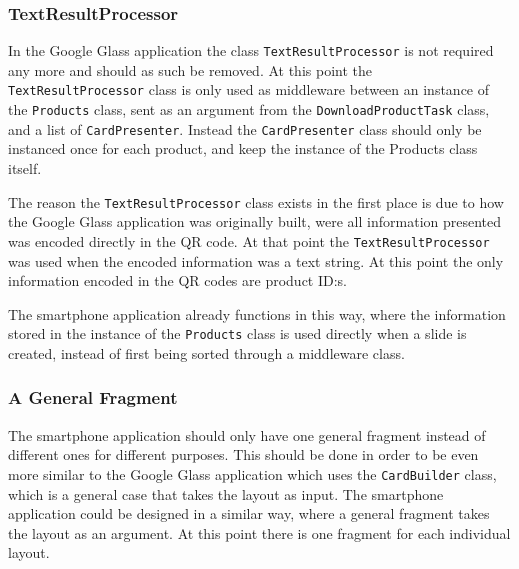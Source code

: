 

\subsubsection{TextResultProcessor}
In the Google Glass application the class \texttt{TextResultProcessor} is not required any more and should as such be removed. At this point the \texttt{TextResultProcessor} class is only used as middleware between an instance of the \texttt{Products} class, sent as an argument from the \texttt{DownloadProductTask} class, and a list of \texttt{CardPresenter}. Instead the \texttt{CardPresenter} class should only be instanced once for each product, and keep the instance of the Products class itself.

The reason the \texttt{TextResultProcessor} class exists in the first place is due to how the Google Glass application was originally built, were all information presented was encoded directly in the QR code. At that point the \texttt{TextResultProcessor} was used when the encoded information was a text string. At this point the only information encoded in the QR codes are product ID:s.

The smartphone application already functions in this way, where the information stored in the instance of the \texttt{Products} class is used directly when a slide is created, instead of first being sorted through a middleware class.


\subsubsection{A General Fragment}
The smartphone application should only have one general fragment instead of different ones for different purposes. This should be done in order to be even more similar to the Google Glass application which uses the \texttt{CardBuilder} class, which is a general case that takes the layout as input. The smartphone application could be designed in a similar way, where a general fragment takes the layout as an argument. At this point there is one fragment for each individual layout.